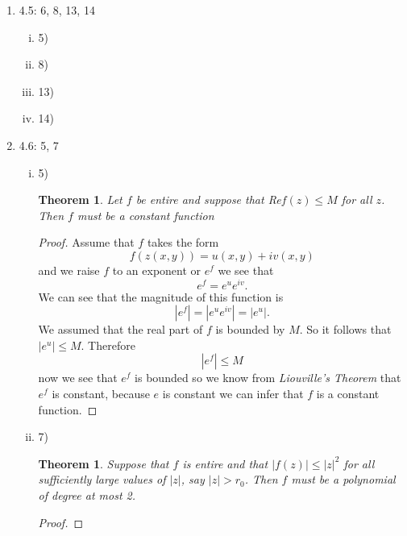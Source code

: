 \documentclass[11pt]{article}
\begin{document}
\begin{enumerate}
\item 4.5: 6, 8, 13, 14
\begin{enumerate}[(i)]
\item 5)\\
\item 8)\\
\item 13)\\
\item 14)\\
\end{enumerate}

\item 4.6:  5, 7
\begin{enumerate}[(i)]
\item 5)\\
\newtheorem{theo4.65}{Theorem}
\begin{theo4.65}
Let $f$ be entire and suppose that Re$f(z)\le M$ for all $z$. Then $f$ must be a constant function
\end{theo4.65}
\begin{proof}
Assume that $f$ takes the form
$$f(z(x,y)) = u(x,y)+iv(x,y)$$
and we raise $f$ to an exponent or $e^f$ we see that
$$e^f = e^ue^{iv}.$$
We can see that the magnitude of this function is
$$|e^f| = |e^ue^{iv}| = |e^u|.$$
We assumed that the real part of $f$ is bounded by $M$. So it follows that $|e^u|\le M$. Therefore
$$|e^f|\le M$$
now we see that $e^f$ is bounded so we know from \emph{Liouville's Theorem} that
$e^f$ is constant, because $e$ is constant we can infer that $f$ is a constant function.
\end{proof}

\item 7)\\
\newtheorem{theo4.67}{Theorem}
\begin{theo4.67}
Suppose that $f$ is entire and that $|f(z)|\le|z|^2$ for all sufficiently large values of $|z|$, say $|z|>r_0$. Then $f$ must be a polynomial of degree at most 2.
\end{theo4.67}
\begin{proof}

\end{proof}
\end{enumerate}
\end{enumerate}
\end{document}
